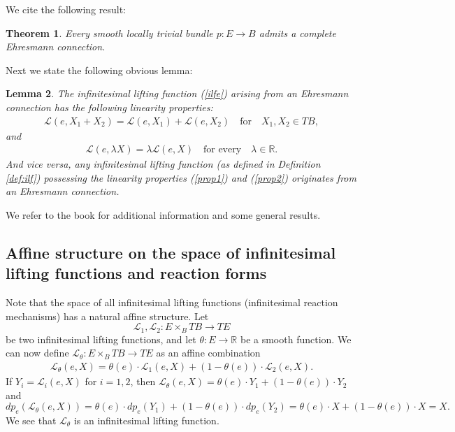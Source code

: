 \documentclass[11pt]{amsart}
\newtheorem{theorem}{Theorem}%
\newtheorem{lemma}[theorem]{Lemma}
\def\R{\mathbb R}
\begin{document}
{We cite the following result:
 
\begin{theorem}\cite{Hoyo} 
Every smooth locally trivial bundle $p:E\to B$ admits a complete Ehresmann connection. 
\end{theorem}

Next we state the following obvious lemma:
\begin{lemma}\label{lm:ehr}
The infinitesimal lifting function (\ref{ilfe}) arising from an Ehresmann connection has the following linearity properties:
\begin{eqnarray}\label{prop1}
\mathcal L(e, X_1+X_2)= \mathcal L(e, X_1)+\mathcal L(e, X_2) \quad \mbox{for} \quad X_1, X_2\in TB,
\end{eqnarray}
and 
\begin{eqnarray}\label{prop2}
\mathcal L(e, \lambda X)=\lambda \mathcal L(e, X)\quad \mbox{for every}\quad \lambda\in \R.
\end{eqnarray}
And vice versa, any infinitesimal lifting function (as defined in Definition \ref{def:ilf}) possessing the linearity properties (\ref{prop1}) and (\ref{prop2}) originates from an Ehresmann connection. 
\end{lemma}
We refer to the book  \cite{KMS} for additional information and some general results. 



\subsection{Affine structure on the space of infinitesimal lifting functions and reaction forms} 
Note that the space of all infinitesimal lifting functions (infinitesimal reaction mechanisms) has a natural affine structure. 
Let 
$$\mathcal L_1, \mathcal L_2: E\times_B TB\to TE$$ be two infinitesimal lifting functions, and 
let 
$
\theta: E\to \R
$
be a smooth function. We can now define $\mathcal L_\theta: E\times_B TB\to TE$ as an affine combination
\begin{eqnarray}\label{eq:aff}
\mathcal L_\theta (e,X)  = \theta (e) \cdot \mathcal L_1(e, X)+ (1-\theta(e))\cdot \mathcal L_2(e, X).
\end{eqnarray}
If $Y_i=\mathcal L_i(e, X)$ for $i=1, 2$, then $\mathcal L_\theta(e, X)=\theta(e)\cdot Y_1+(1-\theta(e))\cdot Y_2$ and 
$$
dp_e(\mathcal L_\theta (e,X)) = \theta(e)\cdot dp_e(Y_1)+(1-\theta(e))\cdot dp_e(Y_2)= \theta(e)\cdot X + (1-\theta(e))\cdot X=X. 
$$
We see that $\mathcal L_\theta$ is an infinitesimal lifting function. 


}
\end{document}
